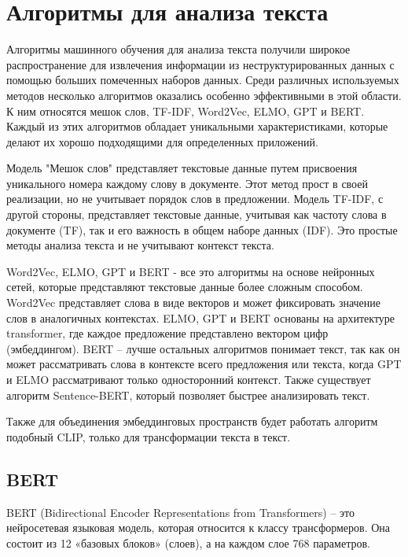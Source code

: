 \documentclass[PI, VKR]{HSEUniversity}
\begin{document}
\section{Алгоритмы для анализа текста}
\label{sec:orgfa52674}
Алгоритмы машинного обучения для анализа текста получили широкое распространение для извлечения информации из неструктурированных данных с помощью больших помеченных наборов данных. Среди различных используемых методов несколько алгоритмов оказались особенно эффективными в этой области. К ним относятся мешок слов\autocite{doi:10.1080/00437956.1954.11659520}, TF-IDF\autocite{jones1972statistical}, Word2Vec\autocite{mikolov2013distributed}, ELMO\autocite{elmo}, GPT\autocite{radford2019language} и BERT\autocite{devlin2018bert}. Каждый из этих алгоритмов обладает уникальными характеристиками, которые делают их хорошо подходящими для определенных приложений.

Модель "Мешок слов" представляет текстовые данные путем присвоения уникального номера каждому слову в документе. Этот метод прост в своей реализации, но не учитывает порядок слов в предложении. Модель TF-IDF, с другой стороны, представляет текстовые данные, учитывая как частоту слова в документе (TF), так и его важность в общем наборе данных (IDF). Это простые методы анализа текста и не учитывают контекст текста.

Word2Vec, ELMO, GPT и BERT - все это алгоритмы на основе нейронных сетей, которые представляют текстовые данные более сложным способом. Word2Vec представляет слова в виде векторов и может фиксировать значение слов в аналогичных контекстах. ELMO, GPT и BERT основаны на архитектуре transformer, где каждое предложение представлено вектором цифр (эмбеддингом). BERT -- лучше остальных алгоритмов понимает текст, так как он может рассматривать слова в контексте всего предложения или текста, когда GPT и ELMO рассматривают только односторонний контекст. Также существует алгоритм Sentence-BERT\autocite{reimers-2019-sentence-bert}, который позволяет быстрее анализировать текст.

Также для объединения эмбеддинговых пространств будет работать алгоритм подобный CLIP\autocite{radford2021learning}, только для трансформации текста в текст.
\subsection{BERT}
\label{sec:org3d89c6f}
BERT \autocite{devlin2018bert} (Bidirectional Encoder Representations from Transformers) -- это нейросетевая языковая модель, которая относится к классу трансформеров. Она состоит из 12 «базовых блоков» (слоев), а на каждом слое 768 параметров.
\end{document}
